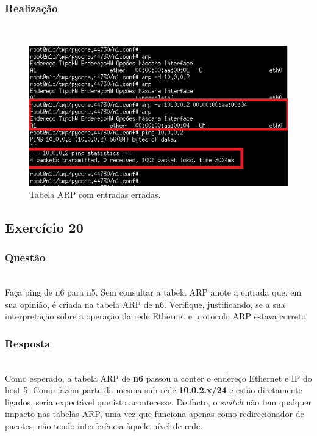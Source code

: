 \documentclass{llncs}
\begin{document}
\subsubsection{Realização}\rule[-10pt]{0pt}{10pt}\\

\begin{figure}
  \begin{center}
    \includegraphics[scale=0.6]{./imagens/5.19.png} 
  \end{center}
  \caption{Tabela ARP com entradas erradas.}
  \label{fig:arp_reply_resp}
\end{figure} 

\clearpage
\subsection{Exercício 20}
\subsubsection{Questão}\rule[-10pt]{0pt}{10pt}\\

Faça ping de n6 para n5. Sem consultar a tabela ARP anote a entrada que, em sua opinião, é criada na tabela ARP de n6. Verifique, justificando, se a sua interpretação sobre a operação da rede Ethernet e protocolo ARP estava correto.

\subsubsection{Resposta}\rule[-10pt]{0pt}{10pt}\\

Como esperado, a tabela ARP de \textbf{n6} passou a conter o endereço Ethernet e IP do host 5. Como fazem parte da mesma sub-rede \textbf{10.0.2.x/24} e estão diretamente ligados, seria expectável que isto acontecesse. De facto, o \textit{switch} não tem qualquer impacto nas tabelas ARP, uma vez que funciona apenas como redirecionador de pacotes, não tendo interferência àquele nível de rede.
\end{document}

